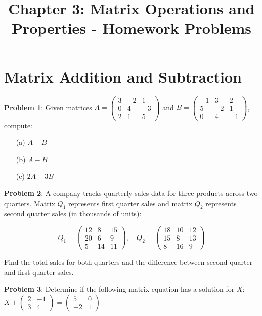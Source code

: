 \documentclass[11pt]{article}
\title{Chapter 3: Matrix Operations and Properties - Homework Problems}
\author{}
\date{}
\begin{document}
\maketitle

\section{Matrix Addition and Subtraction}

\textbf{Problem 1}: Given matrices $A = \begin{pmatrix} 3 & -2 & 1 \\ 0 & 4 & -3 \\ 2 & 1 & 5 \end{pmatrix}$ and $B = \begin{pmatrix} -1 & 3 & 2 \\ 5 & -2 & 1 \\ 0 & 4 & -1 \end{pmatrix}$, compute:

\begin{enumerate}
\item[(a)] $A + B$
\item[(b)] $A - B$
\item[(c)] $2A + 3B$
\end{enumerate}

\textbf{Problem 2}: A company tracks quarterly sales data for three products across two quarters. Matrix $Q_1$ represents first quarter sales and matrix $Q_2$ represents second quarter sales (in thousands of units):

$$Q_1 = \begin{pmatrix} 12 & 8 & 15 \\ 20 & 6 & 9 \\ 5 & 14 & 11 \end{pmatrix}, \quad Q_2 = \begin{pmatrix} 18 & 10 & 12 \\ 15 & 8 & 13 \\ 8 & 16 & 9 \end{pmatrix}$$

Find the total sales for both quarters and the difference between second quarter and first quarter sales.

\textbf{Problem 3}: Determine if the following matrix equation has a solution for $X$:
$X + \begin{pmatrix} 2 & -1 \\ 3 & 4 \end{pmatrix} = \begin{pmatrix} 5 & 0 \\ -2 & 1 \end{pmatrix}$
\end{document}
